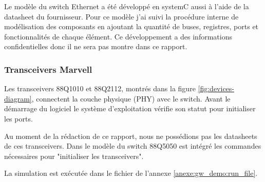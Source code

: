   

Le modèle du switch Ethernet a été développé en systemC aussi à l'aide de la datasheet du fournisseur. Pour ce modèle j'ai suivi la procédure interne de modélisation des composants en ajoutant la quantité de buses, registres, ports et fonctionnalités de chaque élément. Ce développement a des informations confidentielles donc il ne sera pas montre dans ce rapport. 

\subsubsection{Transceivers Marvell} 


Les transceivers 88Q1010 et 88Q2112, montr\'es dans la figure \ref{fig:devices-diagram}\cite{88Q2112}\cite{88Q1010}, connectent la couche physique (PHY) avec le switch. Avant le démarrage du logiciel le système d'exploitation vérifie son statut pour initialiser les ports. 

Au moment de la rédaction de ce rapport, nous ne possédions pas les datasheets de ces transceivers. Dans le modèle du switch 88Q5050 est intégré les commandes nécessaires pour "initialiser les transceivers". 


La simulation est exécutée dans le fichier de l'annexe \ref{anexe:gw_demo:run_file}. 